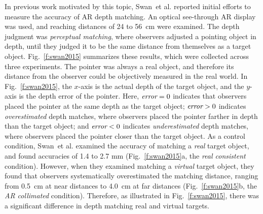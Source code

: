 \documentclass[10pt,journal,compsoc]{IEEEtran}
\makeatletter
\newcommand{\etal}{et al.\@\xspace} %
\makeatother
\begin{document}
In previous work motivated by this topic, Swan~\etal\cite{swan:2015} reported initial efforts to measure the accuracy of AR depth matching.  An optical see-through AR display was used, and reaching distances of 24 to 56~cm were examined.  The depth judgment was \emph{perceptual matching}, where observers adjusted a pointing object in depth, until they judged it to be the same distance from themselves as a target object.  Fig.~\ref{f:swan2015} summarizes these results, which were collected across three experiments.  The pointer was always a real object, and therefore its distance from the observer could be objectively measured in the real world.  In Fig.~\ref{f:swan2015}, the $x$-axis is the actual depth of the target object, and the $y$-axis is the depth error of the pointer.  Here, $\mbox{\it error} = 0$ indicates that observers placed the pointer at the same depth as the target object; $\mbox{\it error} > 0$ indicates \emph{overestimated} depth matches, where observers placed the pointer farther in depth than the target object; and $\mbox{\it error} < 0$ indicates \emph{underestimated} depth matches, where observers placed the pointer closer than the target object.  As a control condition, Swan~\etal\cite{swan:2015} examined the accuracy of matching a \emph{real} target object, and found accuracies of 1.4 to 2.7 mm (Fig.~\ref{f:swan2015}a, the \emph{real consistent} condition).  However, when they examined matching a \emph{virtual} target object, they found that observers systematically overestimated the matching distance, ranging from 0.5~cm at near distances to 4.0~cm at far distances (Fig.~\ref{f:swan2015}b, the \emph{AR collimated} condition).  Therefore, as illustrated in Fig.~\ref{f:swan2015}, there was a significant difference in depth matching real and virtual targets.  
\end{document}
